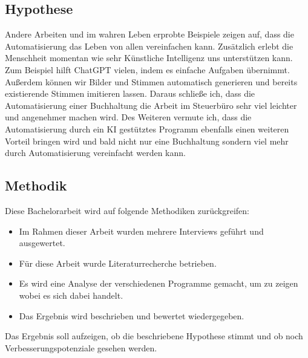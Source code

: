 \documentclass[hidelinks,12pt,a4paper]{article}
\begin{document}
\subsection{Hypothese}
Andere Arbeiten und im wahren Leben erprobte Beispiele zeigen auf, dass die Automatisierung das Leben von allen vereinfachen kann. Zusätzlich erlebt die Menschheit momentan wie sehr Künstliche Intelligenz uns unterstützen kann. Zum Beispiel hilft ChatGPT vielen, indem es einfache Aufgaben übernimmt. Außerdem können wir Bilder und Stimmen automatisch generieren und bereits existierende Stimmen imitieren lassen. 
\newline 
Daraus schließe ich, dass die Automatisierung einer Buchhaltung die Arbeit im Steuerbüro sehr viel leichter und angenehmer machen wird. Des Weiteren vermute ich, dass die Automatisierung durch ein KI gestütztes Programm ebenfalls einen weiteren Vorteil bringen wird und bald nicht nur eine Buchhaltung sondern viel mehr durch Automatisierung vereinfacht werden kann. 

\subsection{Methodik}
Diese Bachelorarbeit wird auf folgende Methodiken zurückgreifen:

\begin{itemize}
	\item Im Rahmen dieser Arbeit wurden mehrere Interviews geführt und ausgewertet.
	\item Für diese Arbeit wurde Literaturrecherche betrieben. 
	\item Es wird eine Analyse der verschiedenen Programme gemacht, um zu zeigen wobei es sich dabei handelt. 
	\item Das Ergebnis wird beschrieben und bewertet wiedergegeben.
\end{itemize}

Das Ergebnis soll aufzeigen, ob die beschriebene Hypothese stimmt und ob noch Verbesserungspotenziale gesehen werden. 
\end{document}
